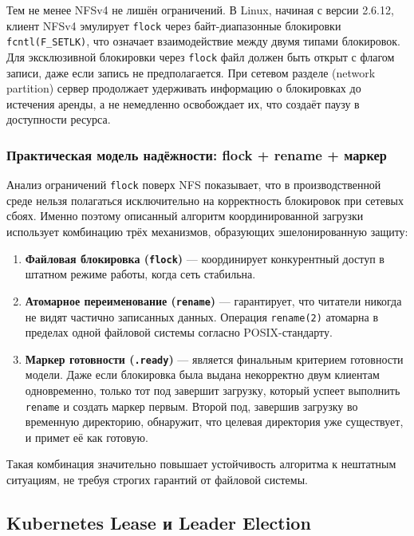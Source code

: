 Тем не менее NFSv4 не лишён ограничений. В Linux, начиная с версии 2.6.12, клиент NFSv4 эмулирует \texttt{flock} через байт-диапазонные блокировки \texttt{fcntl(F\_SETLK)}, что означает взаимодействие между двумя типами блокировок. Для эксклюзивной блокировки через \texttt{flock} файл должен быть открыт с флагом записи, даже если запись не предполагается. При сетевом разделе (network partition) сервер продолжает удерживать информацию о блокировках до истечения аренды, а не немедленно освобождает их, что создаёт паузу в доступности ресурса.

\subsubsection{Практическая модель надёжности: flock + rename + маркер}

Анализ ограничений \texttt{flock} поверх NFS показывает, что в производственной среде нельзя полагаться исключительно на корректность блокировок при сетевых сбоях. Именно поэтому описанный алгоритм координированной загрузки использует комбинацию трёх механизмов, образующих эшелонированную защиту:

\begin{enumerate}[leftmargin=*]
  \item \textbf{Файловая блокировка (\texttt{flock})} --- координирует конкурентный доступ в штатном режиме работы, когда сеть стабильна.
  \item \textbf{Атомарное переименование (\texttt{rename})} --- гарантирует, что читатели никогда не видят частично записанных данных. Операция \texttt{rename(2)} атомарна в пределах одной файловой системы согласно POSIX-стандарту.
  \item \textbf{Маркер готовности (\texttt{.ready})} --- является финальным критерием готовности модели. Даже если блокировка была выдана некорректно двум клиентам одновременно, только тот под завершит загрузку, который успеет выполнить \texttt{rename} и создать маркер первым. Второй под, завершив загрузку во временную директорию, обнаружит, что целевая директория уже существует, и примет её как готовую.
\end{enumerate}

Такая комбинация значительно повышает устойчивость алгоритма к нештатным ситуациям, не требуя строгих гарантий от файловой системы.

\subsection{Kubernetes Lease и Leader Election}

